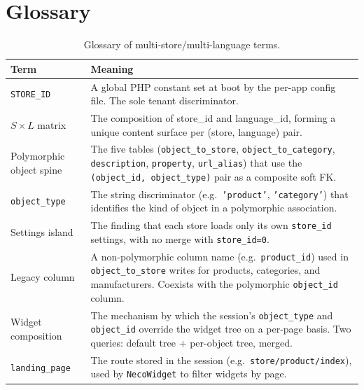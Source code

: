 \documentclass[11pt,a4paper]{article}
\begin{document}
\section{Glossary}\label{app:glossary}

\begin{table}[htbp]
\centering
\caption{Glossary of multi-store/multi-language terms.}\label{tab:glossary-v5}
\footnotesize\sloppy
\begin{tabularx}{\columnwidth}{>{\raggedright\arraybackslash}p{3.5cm}X}
\toprule
\textbf{Term} & \textbf{Meaning} \\
\midrule
\texttt{STORE\_ID} & A global PHP constant set at boot by the per-app config file. The sole tenant discriminator. \\
$S \times L$ matrix & The composition of store\_id and language\_id, forming a unique content surface per (store, language) pair. \\
Polymorphic object spine & The five tables (\texttt{object\_to\_store}, \texttt{object\_to\_category}, \texttt{description}, \texttt{property}, \texttt{url\_alias}) that use the \texttt{(object\_id, object\_type)} pair as a composite soft FK. \\
\texttt{object\_type} & The string discriminator (e.g.\ \texttt{'product'}, \texttt{'category'}) that identifies the kind of object in a polymorphic association. \\
Settings island & The finding that each store loads only its own \texttt{store\_id} settings, with no merge with \texttt{store\_id=0}. \\
Legacy column & A non-polymorphic column name (e.g.\ \texttt{product\_id}) used in \texttt{object\_to\_store} writes for products, categories, and manufacturers. Coexists with the polymorphic \texttt{object\_id} column. \\
Widget composition & The mechanism by which the session's \texttt{object\_type} and \texttt{object\_id} override the widget tree on a per-page basis. Two queries: default tree + per-object tree, merged. \\
\texttt{landing\_page} & The route stored in the session (e.g.\ \texttt{store/product/index}), used by \texttt{NecoWidget} to filter widgets by page. \\
\bottomrule
\end{tabularx}
\end{table}
\end{document}
